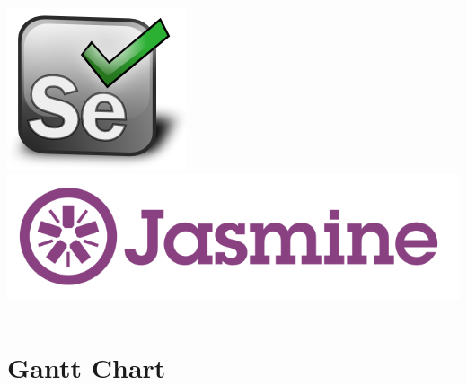 \begin{frame}
\begin{columns}
    \begin{column}{0.2\textwidth}
      \includegraphics[width=.9\textwidth]{images/selenium.png}\\
      \vspace*{2cm}
      \includegraphics[width=\textwidth]{images/jasmine.png}
    \end{column}
  \end{columns}
\end{frame}

\section{Gantt Chart}

